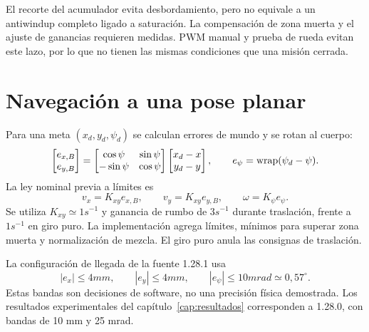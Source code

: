 El recorte del acumulador evita desbordamiento, pero no equivale a un antiwindup completo ligado a saturación. La compensación de zona muerta y el ajuste de ganancias requieren medidas. PWM manual y prueba de rueda evitan este lazo, por lo que no tienen las mismas condiciones que una misión cerrada.

\section{Navegación a una pose planar}
Para una meta $(x_d,y_d,\psi_d)$ se calculan errores de mundo y se rotan al cuerpo:
\begin{equation}
\begin{bmatrix}e_{x,B}\\e_{y,B}\end{bmatrix}
=\begin{bmatrix}\cos\psi&\sin\psi\\-\sin\psi&\cos\psi\end{bmatrix}
\begin{bmatrix}x_d-x\\y_d-y\end{bmatrix},
\qquad e_\psi=\operatorname{wrap}(\psi_d-\psi).
\end{equation}
La ley nominal previa a límites es
\begin{equation}
v_x=K_{xy}e_{x,B},\qquad v_y=K_{xy}e_{y,B},\qquad
\omega=K_\psi e_\psi.
\end{equation}
Se utiliza $K_{xy}\simeq1\unit{s^{-1}}$ y ganancia de rumbo de $3\unit{s^{-1}}$ durante traslación, frente a $1\unit{s^{-1}}$ en giro puro. La implementación agrega límites, mínimos para superar zona muerta y normalización de mezcla. El giro puro anula las consignas de traslación.

La configuración de llegada de la fuente 1.28.1 usa
\begin{equation}
|e_x|\le4\unit{mm},\qquad |e_y|\le4\unit{mm},\qquad
|e_\psi|\le10\unit{mrad}\simeq0{,}57^{\circ}.
\end{equation}
Estas bandas son decisiones de software, no una precisión física demostrada. Los resultados experimentales del capítulo~\ref{cap:resultados} corresponden a 1.28.0, con bandas de 10 mm y 25 mrad.
\FloatBarrier
